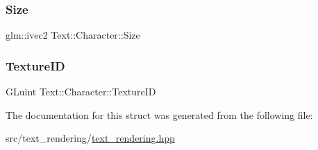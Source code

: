 \mbox{\label{structText_1_1Character_ad4c2b88bfc1232dec53699b361231ca3}} 
\subsubsection{\texorpdfstring{Size}{Size}}
{\footnotesize\ttfamily glm\+::ivec2 Text\+::\+Character\+::\+Size}

\mbox{\label{structText_1_1Character_af360b406edc3ed9092ce7e233ae3acc8}} 
\subsubsection{\texorpdfstring{Texture\+ID}{TextureID}}
{\footnotesize\ttfamily G\+Luint Text\+::\+Character\+::\+Texture\+ID}



The documentation for this struct was generated from the following file\+:\begin{DoxyCompactItemize}
\item 
src/text\+\_\+rendering/\mbox{\hyperlink{text__rendering_8hpp}{text\+\_\+rendering.\+hpp}}\end{DoxyCompactItemize}
